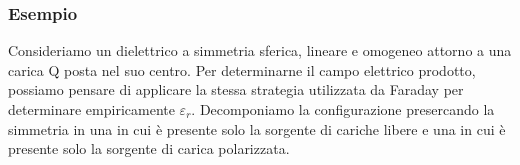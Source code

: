 \begin{center}
\end{center}

\subsubsection{Esempio}

Consideriamo un dielettrico a simmetria sferica, lineare e omogeneo attorno a una carica Q posta nel suo centro. Per determinarne il campo elettrico prodotto, possiamo pensare di applicare la stessa strategia utilizzata da Faraday per determinare empiricamente $\varepsilon_{r}$. Decomponiamo la configurazione presercando la simmetria in una in cui \`e presente solo la sorgente di cariche libere e una in cui \`e presente solo la sorgente di carica polarizzata.

